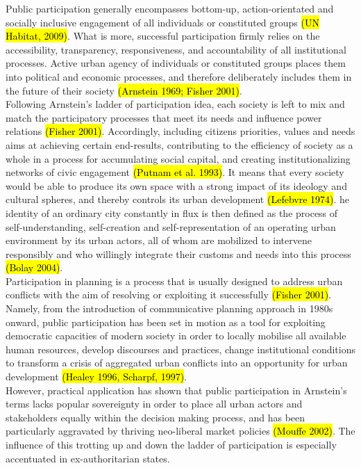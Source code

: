 \documentclass[11pt]{report}
\begin{document}
Public participation generally encompasses bottom-up, action-orientated and socially inclusive engagement of all individuals or constituted groups  \hl{(UN Habitat, 2009)}.
What is more, successful participation firmly relies on the accessibility, transparency, responsiveness, and accountability of all institutional processes. Active urban agency of individuals or constituted groups places them into political and economic processes, and therefore deliberately includes them in the future of their society \hl{(Arnstein 1969; Fisher 2001)}.
\\
Following Arnstein’s ladder of participation idea, each society is left to mix and match the participatory processes that meet its needs and influence power relations \hl{(Fisher 2001)}.
Accordingly, including citizens priorities, values and needs aims at achieving certain end-results, contributing to the efficiency of society as a whole in a process for accumulating social capital, and creating institutionalizing networks of civic engagement \hl{(Putnam et al. 1993)}.
It means that every society would be able to produce its own space with a strong impact of its ideology and cultural spheres, and thereby controls its urban development \hl{(Lefebvre 1974)}. 
he identity of an ordinary city constantly in flux is then defined as the process of self-understanding, self-creation and self-representation of an operating urban environment by its urban actors, all of whom are mobilized to intervene responsibly and who willingly integrate their customs and needs into this process \hl{(Bolay 2004)}.
\\
Participation in planning is a process that is usually designed to address urban conflicts with the aim of resolving or exploiting it successfully \hl{(Fisher 2001)}.
Namely, from the introduction of communicative planning approach in 1980s onward, public participation has been set in motion as a tool for exploiting democratic capacities of modern society in order to locally mobilise all available human resources, develop discourses and practices, change institutional conditions to transform a crisis of aggregated urban conflicts into an opportunity for urban development \hl{(Healey 1996, Scharpf, 1997)}.
\\
However, practical application has shown that public participation in Arnstein’s terms lacks popular sovereignty in order to place all urban actors and stakeholders equally within the decision making process, and has been particularly aggravated by thriving neo-liberal market policies \hl{(Mouffe 2002)}. The influence of this trotting up and down the ladder of participation is especially accentuated in ex-authoritarian states.
\end{document}
